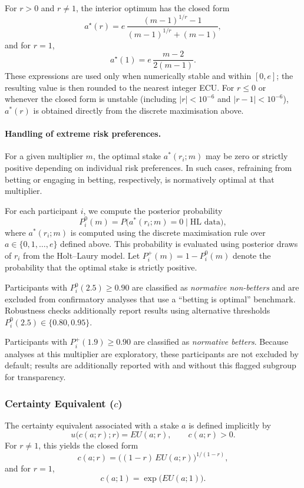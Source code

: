 \documentclass[11pt,a4paper]{article}
\numberwithin{equation}{section}
\begin{document}
For $r>0$ and $r \neq 1$, the interior optimum has the closed form
\[
a^\star(r)
= e\,\frac{(m-1)^{1/r} - 1}{(m-1)^{1/r} + (m-1)},
\]
and for $r=1$,
\[
a^\star(1)
= e\,\frac{m - 2}{2(m - 1)}.
\]
These expressions are used only when numerically stable and within $[0,e]$;
the resulting value is then rounded to the nearest integer ECU. For $r \le 0$
or whenever the closed form is unstable (including $|r|<10^{-6}$ and
$|r-1|<10^{-6}$), $a^*(r)$ is obtained directly from the discrete
maximisation above.

\paragraph{Handling of extreme risk preferences.}

For a given multiplier $m$, the optimal stake $a^*(r_i; m)$
may be zero or strictly positive depending on individual risk preferences. In
such cases, refraining from betting or engaging in betting, respectively, is
normatively optimal at that multiplier.

For each participant $i$, we compute the posterior probability
\[
P_i^{0}(m) = P\big(a^*(r_i; m)=0 \mid \text{HL data}\big),
\]
where $a^*(r_i; m)$ is computed using the discrete maximisation rule over
$a\in\{0,1,\dots,e\}$ defined above. This probability is evaluated using
posterior draws of $r_i$ from the Holt--Laury model. Let
$P_i^{+}(m)=1-P_i^{0}(m)$ denote the probability that the optimal stake is
strictly positive.

Participants with $P_i^{0}(2.5)\ge 0.90$ are classified as
\emph{normative non-betters} and are excluded from confirmatory analyses that
use a ``betting is optimal'' benchmark. Robustness checks additionally report
results using alternative thresholds
$P_i^{0}(2.5)\in\{0.80,0.95\}$.

Participants with $P_i^{+}(1.9)\ge 0.90$ are classified as
\emph{normative betters}. Because analyses at this multiplier are exploratory,
these participants are not excluded by default; results are additionally
reported with and without this flagged subgroup for transparency.



\subsubsection{Certainty Equivalent ($c$)}
The certainty equivalent associated with a stake $a$ is defined implicitly by
\[
u\big(c(a;r); r\big) = EU(a; r),
\qquad c(a;r) > 0.
\]
For $r \neq 1$, this yields the closed form
\[
c(a;r)
= \big((1-r)\,EU(a; r)\big)^{1/(1-r)},
\]
and for $r = 1$,
\[
c(a;1) = \exp\!\big(EU(a;1)\big).
\]
\end{document}
